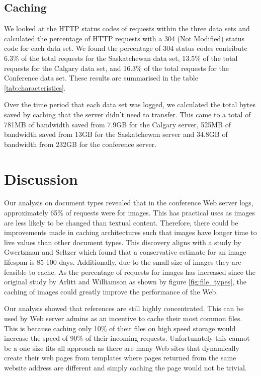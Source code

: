 \documentclass[10pt,conference]{IEEEtran}
\begin{document}
\subsection{Caching} %
\label{sub:caching}
We looked at the HTTP status codes of requests within the three data sets and calculated the percentage of HTTP requests with a 304 (Not Modified) status code for each data set. We found the percentage of 304 status codes contribute 6.3\% of the total requests for the Saskatchewan data set, 13.5\% of the total requests for the Calgary data set, and 16.3\% of the total requests for the Conference data set. These results are summarised in the table \ref{tab:characteristics}.

Over the time period that each data set was logged, we calculated the total bytes saved by caching that the server didn’t need to transfer. This came to a total of 781MB of bandwidth saved from 7.9GB for the Calgary server, 525MB of bandwidth saved from 13GB for the Saskatchewan server and 34.8GB of bandwidth from 232GB for the conference server.

\section{Discussion}\label{discussion}
Our analysis on document types revealed that in the conference Web server logs, approximately 65\% of requests were for images. This has practical uses as images are less likely to be changed than textual content. Therefore, there could be improvements made in caching architectures such that images have longer time to live values than other document types. This discovery aligns with a study by Gwertzman and Seltzer \cite{Gwertzman} which found that a conservative estimate for an image lifespan is 85-100 days. Additionally, due to the small size of images they are feasible to cache. As the percentage of requests for images has increased since the original study by Arlitt and Williamson \cite{invariants} as shown by figure \ref{fig:file_types}, the caching of images could greatly improve the performance of the Web.

Our analysis showed that references are still highly concentrated. This can be used by Web server admins as an incentive to cache their most common files. This is because caching only 10\% of their files on high speed storage would increase the speed of 90\% of their incoming requests. Unfortunately this cannot be a one size fits all approach as there are many Web sites that dynamically create their web pages from templates where pages returned from the same website address are different and simply caching the page would not be trivial.
\end{document}
